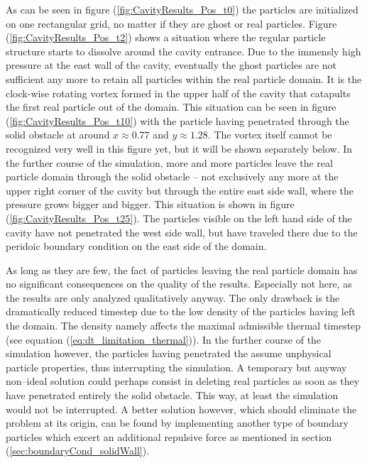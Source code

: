 \documentclass{report}
\begin{document}
As can be seen in figure (\ref{fig:CavityResults_Pos_t0}) the particles are initialized on one rectangular grid, no matter if they are ghost or real particles. Figure (\ref{fig:CavityResults_Pos_t2}) shows a situation where the regular particle structure starts to dissolve around the cavity entrance. 
Due to the immensly high pressure at the east wall of the cavity, eventually the ghost particles are not sufficient any more to retain all particles within the real particle domain. It is the clock-wise rotating vortex formed in the upper half of the cavity that catapults the first real particle out of the domain. This situation can be seen in figure (\ref{fig:CavityResults_Pos_t10}) with the particle having penetrated through the solid obstacle at around $x\approx0.77$ and $y\approx1.28$. The vortex itself cannot be recognized very well in this figure yet, but it will be shown separately below. In the further course of the simulation, more and more particles leave the real particle domain through the solid obstacle -- not exclusively any more at the upper right corner of the cavity but through the entire east side wall, where the pressure grows bigger and bigger. This situation is shown in figure (\ref{fig:CavityResults_Pos_t25}). The particles visible on the left hand side of the cavity have not penetrated the west side wall, but have traveled there due to the peridoic boundary condition on the east side of the domain.

As long as they are few, the fact of particles leaving the real particle domain has no significant consequences on the quality of the results. Especially not here, as the results are only analyzed qualitatively anyway. The only drawback is the dramatically reduced timestep due to the low density of the particles having left the domain. The density namely affects the maximal admissible thermal timestep (see equation (\ref{eq:dt_limitation_thermal})). In the further course of the simulation however, the particles having penetrated the assume unphysical particle properties, thus interrupting the simulation. A temporary but anyway non--ideal solution could perhaps consist in deleting real particles as soon as they have penetrated entirely the solid obstacle. This way, at least the simulation would not be interrupted. A better solution however, which should eliminate the problem at its origin, can be found by implementing another type of boundary particles which excert an additional repulsive force as mentioned in section (\ref{sec:boundaryCond_solidWall}).
\end{document}
